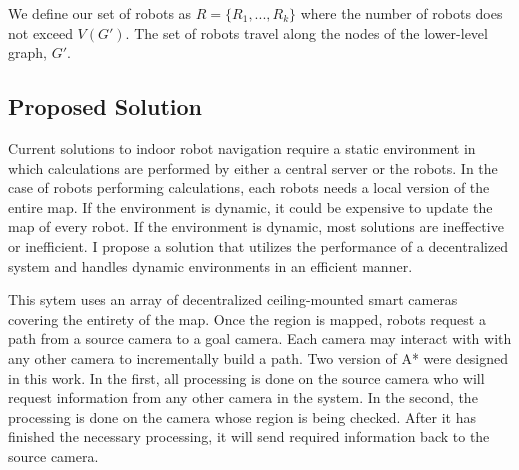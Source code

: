 We define our set of robots as \(R = \{ R_1, ..., R_k \}\) where the number of robots does not exceed \(V(G')\). The set of robots travel along the nodes of the lower-level graph, \(G'\). 

\subsection{Proposed Solution}
Current solutions to indoor robot navigation require a static environment in which calculations are performed by either a central server or the robots. In the case of robots performing calculations, each robots needs a local version of the entire map. If the environment is dynamic, it could be expensive to update the map of every robot. If the environment is dynamic, most solutions are ineffective or inefficient. 
I propose a solution that utilizes the performance of a decentralized system and handles dynamic environments in an efficient manner. 

This sytem uses an array of decentralized ceiling-mounted smart cameras covering the entirety of the map. Once the region is mapped, robots request a path from a source camera to a goal camera. Each camera may interact with with any other camera to incrementally build a path. Two version of A* were designed in this work. In the first, all processing is done on the source camera who will request information from any other camera in the system. In the second, the processing is done on the camera whose region is being checked. After it has finished the necessary processing, it will send required information back to the source camera. 

